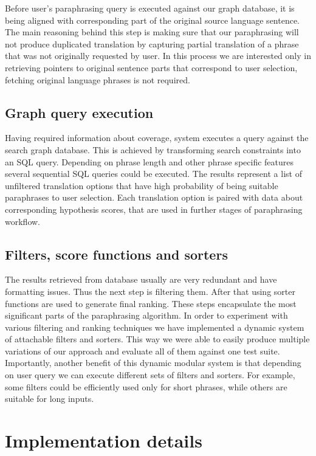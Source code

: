 Before user's paraphrasing query is executed against our graph database, it is being aligned with corresponding part of the original source language sentence. The main reasoning behind this step is making sure that our paraphrasing will not produce duplicated translation by capturing partial translation of a phrase that was not originally requested by user. In this process we are interested only in retrieving pointers to original sentence parts that correspond to user selection, fetching original language phrases is not required.

\subsection{Graph query execution}

Having required information about coverage, system executes a query against the search graph database. This is achieved by transforming search constraints into an SQL query. Depending on phrase length and other phrase specific features several sequential SQL queries could be executed. The results represent a list of unfiltered translation options that have high probability of being suitable paraphrases to user selection. Each translation option is paired with data about corresponding hypothesis scores, that are used in further stages of paraphrasing workflow.

\subsection{Filters, score functions and sorters}

The results retrieved from database usually are very redundant and have formatting issues. Thus the next step is filtering them. After that using sorter functions are used to generate final ranking. These steps encapsulate the most significant parts of the paraphrasing algorithm. In order to experiment with various filtering and ranking techniques we have implemented a dynamic system of attachable filters and sorters. This way we were able to easily produce multiple variations of our approach and evaluate all of them against one test suite. Importantly, another benefit of this dynamic modular system is that depending on user query we can execute different sets of filters and sorters. For example, some filters could be efficiently used only for short phrases, while others are suitable for long inputs. 

\section{Implementation details}

